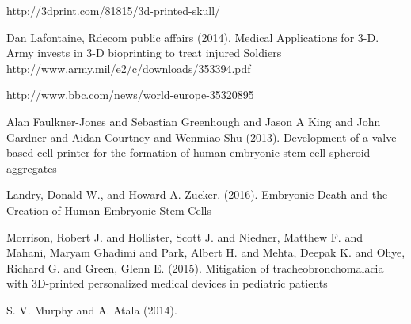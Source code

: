 \documentclass[12pt]{article} %
\begin{document}
\begin{thebibliography}{99} %
\begin{small}

\newblock http://3dprint.com/81815/3d-printed-skull/

\newblock Dan Lafontaine, Rdecom public affairs (2014).
\newline Medical Applications for 3-D. Army invests in 3-D bioprinting to treat injured Soldiers
\newblock http://www.army.mil/e2/c/downloads/353394.pdf

\newblock http://www.bbc.com/news/world-europe-35320895

\newblock Alan Faulkner-Jones and Sebastian Greenhough and Jason A King and John Gardner and Aidan Courtney and Wenmiao Shu (2013).
\newline Development of a valve-based cell printer for the formation of human embryonic stem cell spheroid aggregates

\newblock Landry, Donald W., and Howard A. Zucker. (2016).
\newline Embryonic Death and the Creation of Human Embryonic Stem Cells

\newblock Morrison, Robert J. and Hollister, Scott J. and Niedner, Matthew F. and Mahani, Maryam Ghadimi and Park, Albert H. and Mehta, Deepak K. and Ohye, Richard G. and Green, Glenn E. (2015).
\newline Mitigation of tracheobronchomalacia with 3D-printed personalized medical devices in pediatric patients

\newblock S. V. Murphy and A. Atala (2014).


\end{small}
\end{thebibliography}
\end{document}
